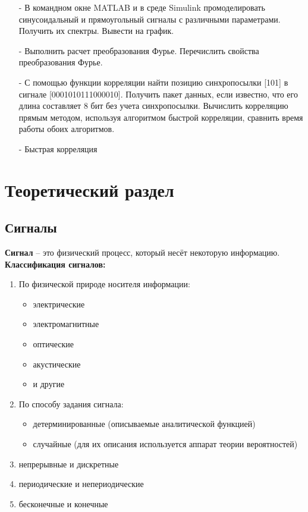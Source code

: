 \documentclass[a4paper,14pt]{extarticle}
\begin{document}
\begin{itemize}
\item[-]
В командном окне MATLAB и в среде Simulink промоделировать 
синусоидальный и прямоугольный сигналы с различными параметрами. 
Получить их спектры. Вывести на график.

\item[-]
Выполнить расчет преобразования Фурье. Перечислить свойства
преобразования Фурье.

\item[-]
С помощью функции корреляции найти позицию синхропосылки [101] в 
сигнале [0001010111000010]. Получить пакет
данных, если известно, что его длина составляет 8 бит без
учета синхропосылки. Вычислить корреляцию прямым методом, 
используя алгоритмом быстрой корреляции, сравнить время работы 
обоих алгоритмов.

\item[-]
Быстрая корреляция
\end{itemize}

\section{Теоретический раздел}

\subsection{Сигналы}

\textbf{Сигнал} -- это физический процесс, который несёт 
некоторую информацию.\\

\textbf{Классификация сигналов:}
\begin{enumerate}
\item По физической природе носителя информации:
	\begin{itemize}
	\item электрические
	\item электромагнитные
	\item оптические
	\item акустические
	\item и другие
	\end{itemize}
\item По способу задания сигнала:
	\begin{itemize}
	\item детерминированные (описываемые аналитической функцией)
	\item случайные (для их описания используется аппарат теории 
	вероятностей)
	\end{itemize}
\item непрерывные и дискретные 
\item периодические и непериодические
\item бесконечные и конечные
\end{enumerate}
\end{document}
